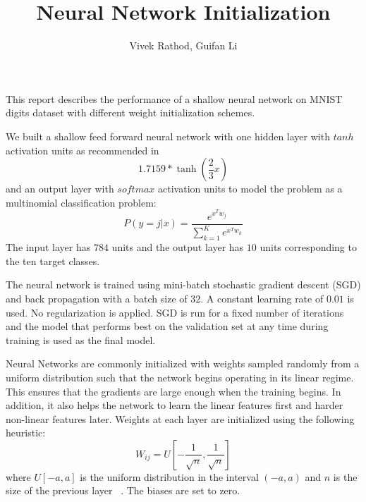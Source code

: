 \documentclass[Proceedings]{ascelike}
\begin{document}
%
\title{Neural Network Initialization}
%
\author{ Vivek Rathod, Guifan Li }
%
\maketitle
%

 This report describes the performance of a shallow neural
network on MNIST digits dataset with different weight initialization schemes.

 \label{sec:network_struct} We built a
shallow feed forward neural network with one hidden layer with $tanh$
activation units as recommended in \cite{lecun2012efficient}
\[1.7159*\tanh\left(\frac{2}{3}x\right)\] and an output layer with $softmax$
activation units to model the problem as a multinomial classification
problem:\[P(y=j|x)=\frac{e^{x^{T}w_j}}{\sum_{k=1}^Ke^{x^{T}w_k}}\] The input
layer has $784$ units and the output layer has $10$ units corresponding to the
ten target classes.

 \label{sec:train_method} The neural network is
trained using mini-batch stochastic gradient descent (SGD) and back propagation
with a batch size of $32$. A constant learning rate of $0.01$ is used. No
regularization is applied. SGD is run for a fixed number of iterations and the
model that performs best on the validation set at any time during training is
used as the final model. 

 \label{sec:weight_init} Neural Networks are
commonly initialized with weights sampled randomly from a uniform distribution
such that the network begins operating in its linear regime. This ensures that
the gradients are large enough when the training begins. In addition, it also
helps the network to learn the linear features first and harder non-linear
features later. Weights at each layer are initialized using the following
heuristic: \[W_{ij} = U\left[-\frac{1}{\sqrt{n}},\frac{1}{\sqrt{n}}\right]\]
where $U[-a, a]$ is the uniform distribution in the interval $(-a, a)$ and $n$
is the size of the previous layer ~\cite{erhan2009difficulty}. The biases are
set to zero.
\end{document}
